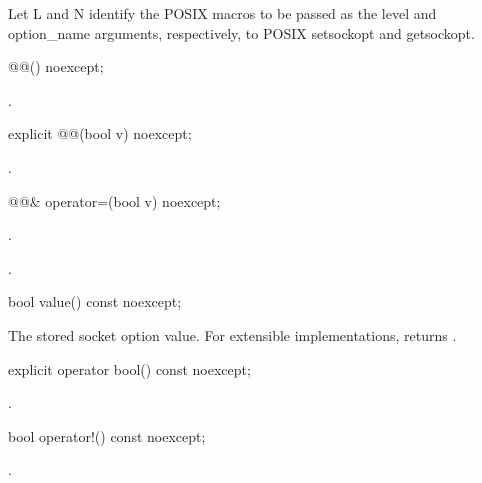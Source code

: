 \pnum
Let L and N identify the POSIX macros to be passed as the level and option_name arguments, respectively, to POSIX setsockopt and getsockopt.

\begin{itemdecl}
@@() noexcept;
\end{itemdecl}

\begin{itemdescr}
\pnum
\postconditions {}.
\end{itemdescr}

\begin{itemdecl}
explicit @@(bool v) noexcept;
\end{itemdecl}

\begin{itemdescr}
\pnum
\postconditions {}.
\end{itemdescr}

\begin{itemdecl}
@@& operator=(bool v) noexcept;
\end{itemdecl}

\begin{itemdescr}
\pnum
\returns {}.

\pnum
\postconditions {}.
\end{itemdescr}

\begin{itemdecl}
bool value() const noexcept;
\end{itemdecl}

\begin{itemdescr}
\pnum
\returns The stored socket option value. For extensible implementations, returns .
\end{itemdescr}

\begin{itemdecl}
explicit operator bool() const noexcept;
\end{itemdecl}

\begin{itemdescr}
\pnum
\returns {}.
\end{itemdescr}

\begin{itemdecl}
bool operator!() const noexcept;
\end{itemdecl}

\begin{itemdescr}
\pnum
\returns {}.
\end{itemdescr}

